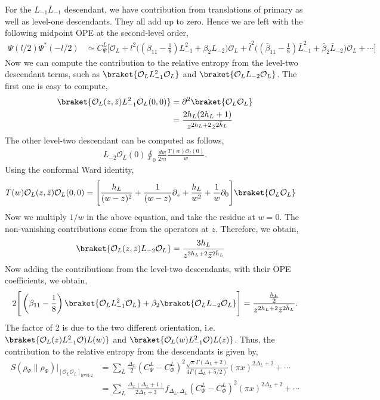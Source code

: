 \documentclass[11pt]{article}
\newcommand{\p}{\partial}
\newcommand{\mO}{\mathcal{O}}
\newcommand{\lb}{\left(}
\newcommand{\rb}{\right)}
\begin{document}
For the $L_{-1}\bar L_{-1}$ descendant, we have contribution from translations of primary as well as level-one descendants. They all add up to zero. Hence we are left with the following midpoint OPE at the second-level order,
\begin{align}
    \Psi(l/2)\Psi^*(-l/2) &\simeq C_\Psi^L \Bigg[ \mO_L + l^2 \Bigg( \lb \beta_{11}-\frac{1}{8}\rb L_{-1}^2 + \beta_2L_{-2}\Bigg)\mO_L + \bar l^2 \Bigg( \lb \bar \beta_{11}-\frac{1}{8}\rb \bar L_{-1}^2 + \bar \beta_2\bar L_{-2}\Bigg)\mO_L + \cdots\Bigg] 
\end{align}
Now we can compute the contribution to the relative entropy from the level-two descendant terms, such as $\braket{\mO_L L_{-1}^2\mO_L}$ and $\braket{\mO_L L_{-2}\mO_L}$. The first one is easy to compute,
\begin{align}
    \braket{\mO_L(z,\bar z) L_{-1}^2\mO_L(0,0)} &= \p^2 \braket{\mO_L\mO_L} 
    \\
    &=\frac{2h_L (2h_L+1)}{z^{2h_L+2} \bar z^{2\bar h_L }}
\end{align}
The other level-two descendant can be computed as follows,
\begin{align}
    L_{-2}\mO_L (0) \oint_0 \frac{dw}{2\pi i } \frac{T(w)\mO_l(0)}{w}.
\end{align}
Using the conformal Ward identity,
\begin{align}
    T(w)\mO_L(z,\bar z)\mO_L(0,0) &= \Bigg[ \frac{h_L}{(w-z)^2}+ \frac{1}{(w-z)}\p_z + \frac{h_L}{w^2} + \frac{1}{w}\p_0 \Bigg]\braket{\mO_L\mO_L}
\end{align}
Now we multiply $1/w$ in the above equation, and take the residue at $w=0$. The non-vanishing contributions come from the operators at $z$. Therefore, we obtain,
\begin{align}
    \braket{\mO_L (z,\bar z) L_{-2}\mO_L} &= \frac{3h_L}{z^{2h_L + 2}\bar z ^{2\bar h_L}}
\end{align}
Now adding the contributions from the level-two descendants, with their OPE coefficients, we obtain,
\begin{align}
    2 \Bigg[ \lb \beta_{11}-\frac{1}{8} \rb\braket{\mO_L L_{-1}^2\mO_L} + \beta_2 \braket{\mO_L L_{-2}\mO_L}\Bigg] = \frac{\frac{h_L}{2}}{z^{2h_L+2}\bar z^{2\bar h_L}}.
\end{align}
The factor of 2 is due to the two different orientation, i.e. $\braket{\mO_L(z)L_{-1}^2\mO)L(w)}$ and $\braket{\mO_L(w)L_{-1}^2\mO)L(z)}$. Thus, the contribution to the relative entropy from the descendants is given by,
\begin{align}
    S(\rho_\Psi \|\rho_\Phi) \Big|_{[\mO_L\mO_L]_{\text{level-2}}} &= \sum_L \frac{\Delta_L}{2}(C_\Psi^L - C_\Phi^L)^2 \frac{\sqrt \pi \Gamma(\Delta_L + 2)}{4\Gamma(\Delta_L + 5/2)}(\pi x)^{2\Delta_L + 2} + \cdots\\
    &= \sum_L \frac{\Delta_L (\Delta_L + 1)}{2\Delta_L + 3} f_{\Delta_L,\Delta_L}(C_\Psi^L - C_\Phi^L)^2(\pi x)^{2\Delta_L + 2} + \cdots
\end{align}
\end{document}
